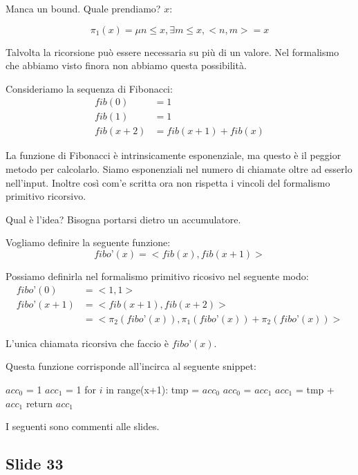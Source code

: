 Manca un bound. Quale prendiamo? $x$:

\begin{equation*}
    \pi_{1}(x) = \mu n \leq x, \exists m \leq x, <n,m> = x
\end{equation*}

Talvolta la ricorsione può essere necessaria su più di un valore. Nel formalismo che abbiamo visto
finora non abbiamo questa possibilità.

Consideriamo la sequenza di Fibonacci:
\begin{align*}
    \textit{fib}(0) &= 1 \\
    \textit{fib}(1) &= 1 \\
    \textit{fib}(x+2) &= \textit{fib}(x+1) + \textit{fib}(x)
\end{align*}

La funzione di Fibonacci è intrinsicamente esponenziale, ma questo è il peggior metodo per
calcolarlo. Siamo esponenziali nel numero di chiamate oltre ad esserlo nell'input. Inoltre così
com'e scritta ora non rispetta i vincoli del formalismo primitivo ricorsivo.

Qual è l'idea? Bisogna portarsi dietro un accumulatore.

Vogliamo definire la seguente funzione:
\begin{equation*}
    \textit{fibo'}(x) = <\textit{fib}(x),\textit{fib}(x+1)>
\end{equation*}

Possiamo definirla nel formalismo primitivo ricosivo nel seguente modo:
\begin{align*}
    \textit{fibo'}(0) &= <1,1> \\
    \textit{fibo'}(x+1) &= <\textit{fib}(x+1),\textit{fib}(x+2)> \\
    &= <\pi_{2}(\textit{fibo'}(x)),\pi_{1}(\textit{fibo'}(x)) + \pi_{2}(\textit{fibo'}(x))>
\end{align*}

L'unica chiamata ricorsiva che faccio è $\textit{fibo'}(x)$.

Questa funzione corrisponde all'incirca al seguente snippet:
 
\begin{python}
$acc_{0}$ = 1
$acc_{1}$ = 1 
for $i$ in range(x+1):
    tmp = $acc_{0}$
    $acc_{0}$ = $acc_{1}$
    $acc_{1}$ = tmp + $acc_{1}$
return $acc_{1}$
\end{python}

I seguenti sono commenti alle slides.

\subsection{Slide 33}

